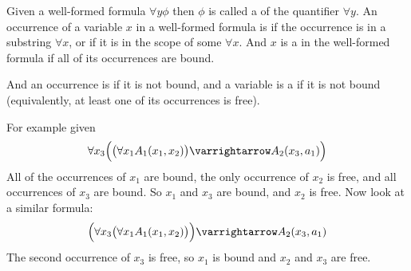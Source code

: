 \documentclass[10pt]{article}
\let\to=\varrightarrow
\begin{document}
\begin{defn*}

    Given a well-formed formula $\forall y\phi$ then $\phi$ is called a  of the quantifier $\forall y$.
    An occurrence of a variable $x$ in a well-formed formula is  if the occurrence is in a substring $\forall x$, or if it is in the scope of some $\forall x$.
    And $x$ is a  in the well-formed formula if all of its occurrences are bound.

    And an occurrence is  if it is not bound, and a variable is a  if it is not bound (equivalently, at least one of its occurrences is free).

\end{defn*}

\begin{exam*}

    For example given
    \[ \forall x_3\Bigl(\bigl(\forall x_1 A_1(x_1,x_2)\bigr)\to A_2(x_3, a_1)\Bigr) \]
    All of the occurrences of $x_1$ are bound, the only occurrence of $x_2$ is free, and all occurrences of $x_3$ are bound.
    So $x_1$ and $x_3$ are bound, and $x_2$ is free.
    Now look at a similar formula:
    \[ \Bigl(\forall x_3\bigl(\forall x_1 A_1(x_1,x_2)\bigr)\Bigr)\to A_2(x_3, a_1) \]
    The second occurrence of $x_3$ is free, so $x_1$ is bound and $x_2$ and $x_3$ are free.

\end{exam*}
\end{document}
